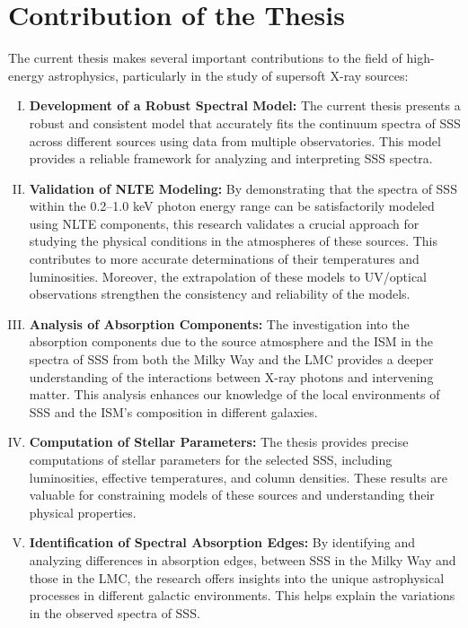     \section{Contribution of the Thesis} \label{introduction:thesis_contribution}
    	The current thesis makes several important contributions to the field of high-energy astrophysics, particularly in the study of supersoft X-ray sources:
    	\begin{enumerate}[I.]
    		\item \textbf{Development of a Robust Spectral Model:} The current thesis presents a robust and consistent model that accurately fits the continuum spectra of SSS across different sources using data from multiple observatories. This model provides a reliable framework for analyzing and interpreting SSS spectra.
    		
    		\item \textbf{Validation of NLTE Modeling:} By demonstrating that the spectra of SSS within the 0.2--1.0 keV photon energy range can be satisfactorily modeled using NLTE components, this research validates a crucial approach for studying the physical conditions in the atmospheres of these sources. This contributes to more accurate determinations of their temperatures and luminosities. Moreover, the extrapolation of these models to UV/optical observations strengthen the consistency and reliability of the models.
    		
    		\item \textbf{Analysis of Absorption Components:} The investigation into the absorption components due to the source atmosphere and the ISM in the spectra of SSS from both the Milky Way and the LMC provides a deeper understanding of the interactions between X-ray photons and intervening matter. This analysis enhances our knowledge of the local environments of SSS and the ISM's composition in different galaxies.
    		
    		\item \textbf{Computation of Stellar Parameters:} The thesis provides precise computations of stellar parameters for the selected SSS, including luminosities, effective temperatures, and column densities. These results are valuable for constraining models of these sources and understanding their physical properties.
    		
    		\item \textbf{Identification of Spectral Absorption Edges:} By identifying and analyzing differences in absorption edges, between SSS in the Milky Way and those in the LMC, the research offers insights into the unique astrophysical processes in different galactic environments. This helps explain the variations in the observed spectra of SSS.
    		

\end{enumerate}
